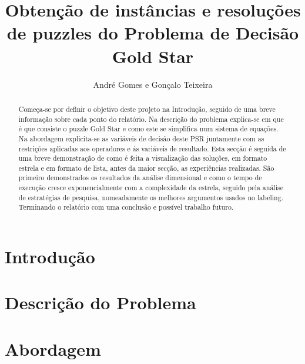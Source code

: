 \documentclass[runningheads]{llncs}
\begin{document}
%
\title{Obtenção de instâncias e resoluções de puzzles do Problema de Decisão Gold Star}
%
%
\author{André Gomes e
Gonçalo Teixeira}
%
%
%
\maketitle              %
%
\begin{abstract}
Começa-se por definir o objetivo deste projeto na Introdução, seguido de uma breve informação sobre cada ponto do relatório. Na descrição do problema explica-se em que é que consiste o puzzle Gold Star e como este se simplifica num sistema de equações. Na abordagem explicita-se as variáveis de decisão deste PSR juntamente com as restrições aplicadas aos operadores e ás variáveis de resultado. Esta secção é seguida de uma breve demonstração de como é feita a visualização das soluções, em formato estrela e em formato de lista, antes da maior secção, as experiências realizadas. São primeiro demonstrados os resultados da análise dimensional e como o tempo de execução cresce exponencialmente com a complexidade da estrela, seguido pela análise de estratégias de pesquisa, nomeadamente os melhores argumentos usados no labeling. Terminando o relatório com uma conclusão e possível trabalho futuro.

\end{abstract}
%
%
%
\section{Introdução}


\section{Descrição do Problema}


\section{Abordagem}

\end{document}
